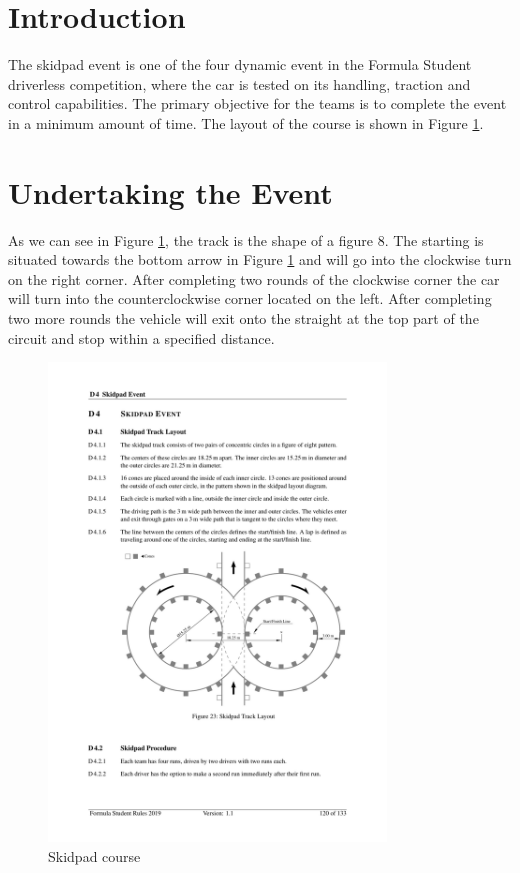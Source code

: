 \documentclass[a4paper, 11pt]{article}
\begin{document}
\begin{titlepage}
	
\end{titlepage}

\newpage

\tableofcontents

\newpage

\section{Introduction}

The skidpad event is one of the four dynamic event in the Formula Student driverless competition, where the car is tested on its handling, traction and control capabilities. The primary objective for the teams is to complete the event in a minimum amount of time. The layout of the course is shown in Figure \ref{fig:SkidpadTrack}.

\section{Undertaking the Event}

As we can see in Figure \ref{fig:SkidpadTrack}, the track is the shape of a figure 8. The starting is situated towards the bottom arrow in Figure \ref{fig:SkidpadTrack} and will go into the clockwise turn on the right corner. After completing two rounds of the clockwise corner the car will turn into the counterclockwise corner located on the left. After completing two more rounds the vehicle will exit onto the straight at the top part of the circuit and stop within a specified distance.

\begin{figure}[H]
	\centering
	\includegraphics[trim = 4.5cm 8cm 2.5cm 11.5cm, clip, width = 0.8\textwidth]{Figures/SkidpadTrack}
	\caption{Skidpad course}
	\label{fig:SkidpadTrack}
\end{figure}
\end{document}
